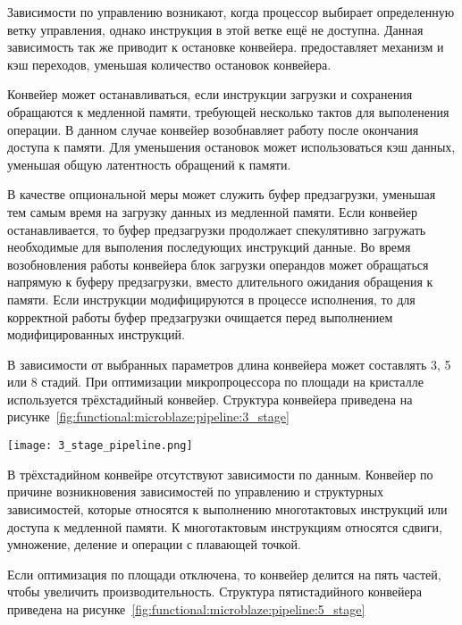 Зависимости по управлению возникают, когда процессор выбирает определенную ветку управления, однако инструкция
в этой ветке ещё не доступна. Данная зависимость так же приводит к остановке конвейера.  предоставляет
механизм  и кэш переходов, уменьшая количество остановок конвейера.

Конвейер может останавливаться, если инструкции загрузки и сохранения обращаются к медленной памяти, требующей
несколько тактов для выполенения операции. В данном случае конвейер возобнавляет работу после окончания доступа к
памяти. Для уменьшения остановок может использоваться кэш данных, уменьшая общую латентность обращений к памяти.

В качестве опциональной меры может служить буфер предзагрузки, уменьшая тем самым время на загрузку данных из
медленной памяти. Если конвейер останавливается, то буфер предзагрузки продолжает спекулятивно загружать необходимые
для выполения последующих инструкций данные. Во время возобновления работы конвейера блок загрузки операндов может
обращаться напрямую к буферу предзагрузки, вместо длительного ожидания обращения к памяти. Если инструкции модифицируются
в процессе исполнения, то для корректной работы буфер предзагрузки очищается перед выполнением модифицированных инструкций.

В зависимости от выбранных параметров длина конвейера может составлять 3, 5 или 8 стадий.
При оптимизации микропроцессора по площади на кристалле используется трёхстадийный конвейер. Структура конвейера
приведена на рисунке~\ref{fig:functional:microblaze:pipeline:3_stage}

\begin{center}
  \centering
  \texttt{[image: 3\_stage\_pipeline.png]}
  \label{fig:functional:microblaze:pipeline:3_stage}
\end{center}

В трёхстадийном конвейре отсутствуют зависимости по данным. Конвейер по причине возникновения
зависимостей по управлению и структурных зависимостей, которые относятся к выполнению многотактовых
инструкций или доступа к медленной памяти. К многотактовым инструкциям относятся сдвиги, умножение,
деление и операции с плавающей точкой.

Если оптимизация по площади отключена, то конвейер делится на пять частей, чтобы увеличить
производительность.
Структура пятистадийного конвейера приведена на рисунке~\ref{fig:functional:microblaze:pipeline:5_stage}

